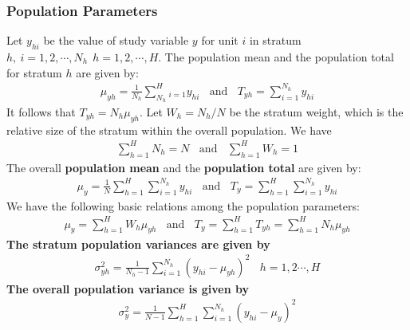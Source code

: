 \documentclass[a4paper,twoside,11pt]{article}
\begin{document}
{\subsubsection{Population Parameters}
Let $y_{hi}$ be the value of study variable $y$ for unit $i$ in stratum $h, \ i=1,2,\cdots, N_h \ \ h=1,2,\cdots, H$. The population mean and the population total for stratum $h$ are given by:
\begin{equation*}
\begin{aligned}
\mu_{yh} = \frac{1}{N_h} \sum^H_{N_h}_{i=1} y_{hi} \ \ \ \ \text{and} \ \ \ \ T_{yh} = \sum^{N_h}_{i=1} y_{hi}
\end{aligned}
\end{equation*}
It follows that $T_{yh} = N_h \mu_{yh}$. Let $W_h = N_h/N$ be the stratum weight, which is the relative size of the stratum within the overall population. We have
\begin{equation*}
\begin{aligned}
\sum^H_{h=1} N_h = N \ \ \ \ \text{and} \ \ \ \ \sum^H_{h=1} W_h = 1
\end{aligned}
\end{equation*}
The overall \textbf{population mean} and the \textbf{population total} are given by:
\begin{equation*}
\begin{aligned}
\mu_y = \frac{1}{N}\sum^H_{h=1}\sum^{N_h}_{i=1} y_{hi} \ \ \ \ \text{and} \ \ \ \ T_y = \sum^H_{h=1} \sum^{N_h}_{i=1} y_{hi}
\end{aligned}
\end{equation*}
We have the following basic relations among the population parameters:
\begin{equation*}
\begin{aligned}
\mu_y = \sum^H_{h=1}W_h \mu_{yh} \ \ \ \ \text{and} \ \ \ \ T_y = \sum^H_{h=1} T_{yh} = \sum^H_{h=1} N_h \mu_{yh}
\end{aligned}
\end{equation*}
\textbf{The stratum population variances are given by}
\begin{equation*}
\begin{aligned}
\sigma_{yh}^2 = \frac{1}{N_h -1} \sum^{N_h}_{i=1} (y_{hi} - \mu_{yh})^2 \ \ \ \ h=1,2\cdots, H
\end{aligned}
\end{equation*}
\textbf{The overall population variance is given by}
\begin{equation*}
\begin{aligned}
\sigma_y^2 = \frac{1}{N-1} \sum^H_{h=1} \sum^{N_h}_{i=1}(y_{hi} - \mu_y)^2

\end{aligned}
\end{equation*}}
\end{document}
